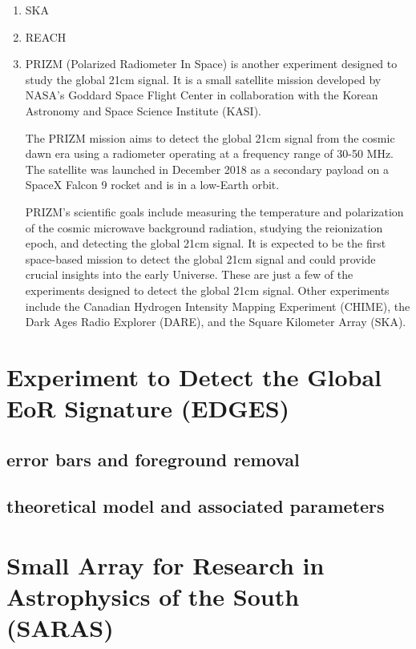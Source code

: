 \documentclass[12pt, TexShade, letterpaper]{report}
\begin{document}
\begin{enumerate}
\item SKA
\item REACH
\item PRIZM (Polarized Radiometer In Space) is another experiment designed to study the global 21cm signal. It is a small satellite mission developed by NASA's Goddard Space Flight Center in collaboration with the Korean Astronomy and Space Science Institute (KASI).

The PRIZM mission aims to detect the global 21cm signal from the cosmic dawn era using a radiometer operating at a frequency range of 30-50 MHz. The satellite was launched in December 2018 as a secondary payload on a SpaceX Falcon 9 rocket and is in a low-Earth orbit.

PRIZM's scientific goals include measuring the temperature and polarization of the cosmic microwave background radiation, studying the reionization epoch, and detecting the global 21cm signal. It is expected to be the first space-based mission to detect the global 21cm signal and could provide crucial insights into the early Universe.
These are just a few of the experiments designed to detect the global 21cm signal. Other experiments include the Canadian Hydrogen Intensity Mapping Experiment (CHIME), the Dark Ages Radio Explorer (DARE), and the Square Kilometer Array (SKA).
\end{enumerate}
\section{Experiment to Detect the Global EoR Signature (EDGES)}
\subsection{error bars and foreground removal}
\subsection{theoretical model and associated parameters}
\section{Small Array for Research in Astrophysics of the South (SARAS)}
\end{document}
